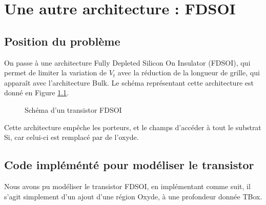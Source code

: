 \documentclass[a4paper,11pt]{report}
\begin{document}
\chapter{Une autre architecture : FDSOI}

\section{Position du problème}

On passe à une architecture Fully Depleted Silicon On Insulator (FDSOI), qui permet de limiter la variation de $V_t$ avec la réduction de la longueur de grille, qui apparaît avec l'architecture Bulk.  Le schéma représentant cette architecture est donné en Figure \ref{SchemaFDSOI}.

\begin{figure}[H]
    \centering
    \caption{Schéma d'un transistor FDSOI}
    \label{SchemaFDSOI}
\end{figure}

Cette architecture empêche les porteurs, et le champs d'accéder à tout le substrat Si, car celui-ci est remplacé par de l'oxyde.
\newpage

\section{Code impléménté pour modéliser le transistor}
Nous avons pu modéliser le transistor FDSOI, en implémentant comme suit, il s'agit simplement d'un ajout d'une région Oxyde, à une profondeur donnée TBox.
\end{document}
